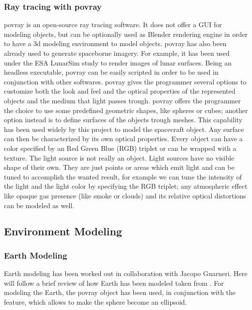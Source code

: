 \subsubsection{Ray tracing with \acrshort{povray}}
\acrshort{povray} is an open-source ray tracing software. It does not offer a GUI for modeling objects, but can be optionally used as Blender rendering engine in order to have a \acrshort{3d} modeling environment to model objects. \acrshort{povray} has also been already used to generate spaceborne imagery. For example, it has been used under the ESA LunarSim study to render images of lunar surfaces. Being an headless executable, \acrshort{povray} can be easily scripted in order to be used in conjunction with other softwares.
\acrshort{povray} gives the programmer several options to customize both the look and feel and the optical properties of the represented objects and the medium that light passes trough. \acrshort{povray} offers the programmer the choice to use some predefined geometric shapes, like spheres or cubes; another option instead is to define surfaces of the objects trough meshes. This capability has been used widely by this project to model the spacecraft object.
Any surface can then be characterized by its own optical properties. Every object can have a color specified by an Red Green Blue (RGB) triplet or can be wrapped with a texture.
The light source is not really an object. Light sources have no visible shape of their own. They are just points or areas which emit light and can be tuned to accomplish the wanted result, for example we can tune the intensity of the light and the light color by specifying the RGB triplet; any atmospheric effect like opaque gas presence (like smoke or clouds) and its relative optical distortions can be modeled as well.

\subsection{Environment Modeling}
\subsubsection{Earth Modeling}
Earth modeling has been worked out in collaboration with Jacopo Guarneri.
Here will follow a brief review of how Earth has been modeled taken from \cite{jacopo}.
For modeling the Earth, the \acrshort{povray}  object has been used, in conjunction with the  feature, which allows to make the sphere become an ellipsoid.

